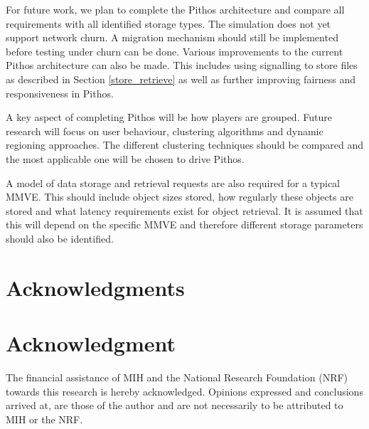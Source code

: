 \documentclass[10pt,a4paper,conference]{IEEEtran}
\begin{document}
For future work, we plan to complete the Pithos architecture and compare all requirements with all identified storage types. The simulation does not
yet support network churn. A migration mechanism should still be implemented before testing under churn can be done. Various improvements to the
current Pithos architecture can also be made. This includes using signalling to store files as described in Section \ref{store_retrieve} as well as
further improving fairness and responsiveness in Pithos.

A key aspect of completing Pithos will be how players are grouped. Future research will focus on user behaviour, clustering algorithms and dynamic
regioning approaches. The different clustering techniques should be compared and the most applicable one will be chosen to drive Pithos.

A model of data storage and retrieval requests are also required for a typical MMVE. This should include object sizes stored, how regularly these
objects are stored and what latency requirements exist for object retrieval. It is assumed that this will depend on the specific MMVE and therefore
different storage parameters should also be identified.


\ifCLASSOPTIONcompsoc
  \section*{Acknowledgments}
\else
  \section*{Acknowledgment}
\fi

The financial assistance of MIH and the National Research Foundation (NRF) towards this research is hereby acknowledged. Opinions expressed and
conclusions arrived at, are those of the author and are not necessarily to be attributed to MIH or the NRF.




\end{document}
